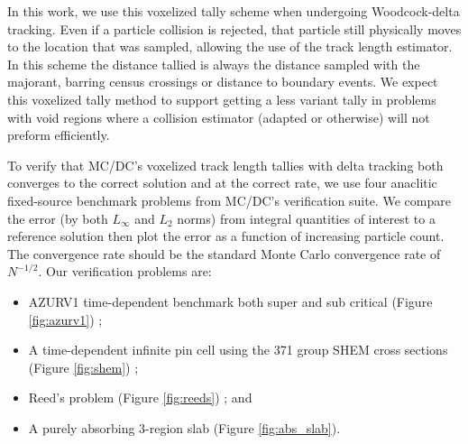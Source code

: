 In this work, we use this voxelized tally scheme when undergoing Woodcock-delta tracking.
Even if a particle collision is rejected, that particle still physically moves to the location that was sampled, allowing the use of the track length estimator.
In this scheme the distance tallied is always the distance sampled with the majorant, barring census crossings or distance to boundary events.
We expect this voxelized tally method to support getting a less variant tally in problems with void regions where a collision estimator (adapted or otherwise) will not preform efficiently.

To verify that MC/DC's voxelized track length tallies with delta tracking both converges to the correct solution and at the correct rate, we use four anaclitic fixed-source benchmark problems from MC/DC's verification suite.
We compare the error (by both $L_\infty$ and $L_2$ norms) from integral quantities of interest to a reference solution then plot the error as a function of increasing particle count.
The convergence rate should be the standard Monte Carlo convergence rate of $N^{-1/2}$.
Our verification problems are:
\begin{itemize}
    \item AZURV1 time-dependent benchmark both super and sub critical (Figure \ref{fig:azurv1}) \cite{ganapol_homogeneous_2001};
    \item A time-dependent infinite pin cell using the 371 group SHEM cross sections (Figure \ref{fig:shem}) \cite{hfaiedh_2005_shem}; 
    \item Reed's problem (Figure \ref{fig:reeds}) \cite{reed_difference_1971}; and
    \item A purely absorbing 3-region slab (Figure \ref{fig:abs_slab}).
\end{itemize}
